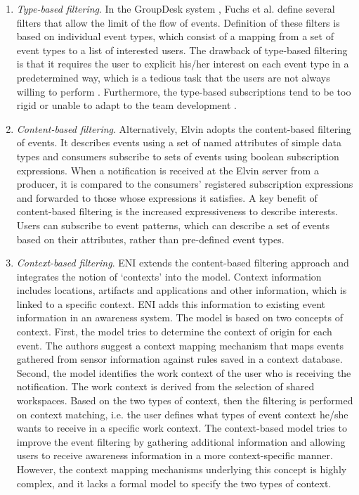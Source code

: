 \begin{enumerate}
   \item \emph{Type-based filtering}. In the GroupDesk system \cite{Fuchs1995}, Fuchs et al. define several filters that allow the limit of the flow of events. Definition of these filters is based on individual event types, which consist of a mapping from a set of event types to a list of interested users. The drawback of type-based filtering is that it requires the user to explicit his/her interest on each event type in a predetermined way, which is a tedious task that the users are not always willing to perform \cite{Grudin1994}. Furthermore, the type-based subscriptions tend to be too rigid or unable to adapt to the team development \cite{Alarcon2002}.
   \item \emph{Content-based filtering}. Alternatively, Elvin \cite{Fitzpatrick2002} adopts the content-based filtering of events. It describes events using a set of named attributes of simple data types and consumers subscribe to sets of events using boolean subscription expressions. When a notification is received at the Elvin server from a producer, it is compared to the consumers' registered subscription expressions and forwarded to those whose expressions it satisfies. A key benefit of content-based filtering is the increased expressiveness to describe interests. Users can subscribe to event patterns, which can describe a set of events based on their attributes, rather than pre-defined event types.
   \item \emph{Context-based filtering}. ENI \cite{Gross2004} extends the content-based filtering approach and integrates the notion of `contexts' into the model. Context information includes locations, artifacts and applications and other information, which is linked to a specific context. ENI adds this information to existing event information in an awareness system. The model is based on two concepts of context. First, the model tries to determine the context of origin for each event. The authors suggest a context mapping mechanism that maps events gathered from sensor information against rules saved in a context database. Second, the model identifies the work context of the user who is receiving the notification. The work context is derived from the selection of shared workspaces. Based on the two types of context, then the filtering is performed on context matching, i.e. the user defines what types of event context he/she wants to receive in a specific work context. The context-based model tries to improve the event filtering by gathering additional information and allowing users to receive awareness information in a more context-specific manner. However, the context mapping mechanisms underlying this concept is highly complex, and it lacks a formal model to specify the two types of context.
\end{enumerate}

